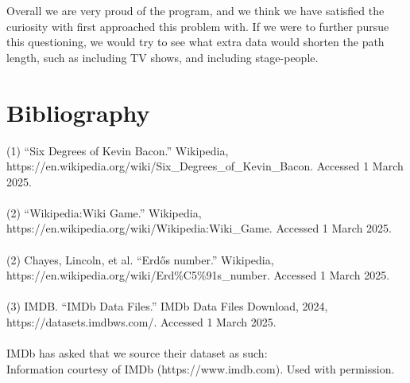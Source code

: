 \documentclass{article}
\begin{document}
Overall we are very proud of the program, and we think we have satisfied the curiosity with first approached this problem with. If we were to further pursue this questioning, we would try to see what extra data would shorten the path length, such as including TV shows, and including stage-people.
\section{Bibliography}

(1) “Six Degrees of Kevin Bacon.” Wikipedia, https://en.wikipedia.org/wiki/Six\_Degrees\_of\_Kevin\_Bacon. Accessed 1 March 2025.\\\\

(2) “Wikipedia:Wiki Game.” Wikipedia, https://en.wikipedia.org/wiki/Wikipedia:Wiki\_Game. Accessed 1 March 2025.\\\\

(2) Chayes, Lincoln, et al. “Erdős number.” Wikipedia, https://en.wikipedia.org/wiki/Erd\%C5\%91s\_number. Accessed 1 March 2025.\\\\

(3) IMDB. “IMDb Data Files.” IMDb Data Files Download, 2024, https://datasets.imdbws.com/. Accessed 1 March 2025.\\\\



IMDb has asked that we source their dataset as such:\\
Information courtesy of
IMDb
(https://www.imdb.com).
Used with permission.
\end{document}
